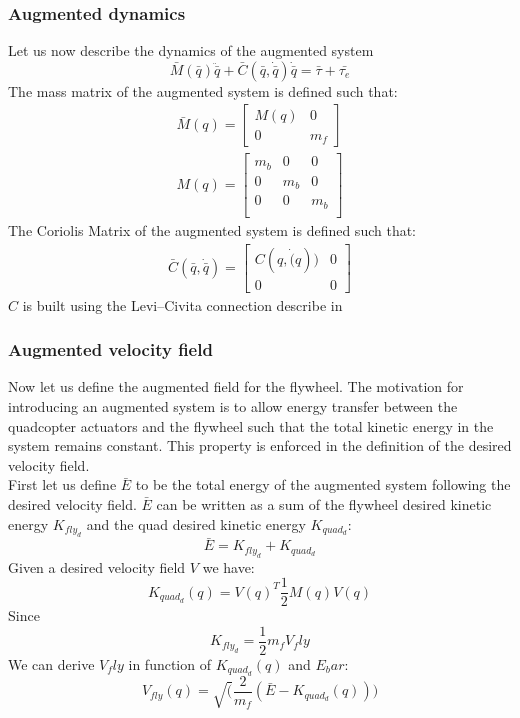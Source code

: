 \subsubsection{Augmented dynamics}
Let us now describe the dynamics of the augmented system
\begin{equation} 
    \bar{M}(\bar{q})\ddot{\bar{q}} + \bar{C}(\bar{q}, \dot{\bar{q}})\dot{\bar{q}} = \bar{\tau} + \bar{\tau_{e}}
\end{equation}
The mass matrix of the augmented system is defined such that:
\begin{align}
\bar{M}(q) = \begin{bmatrix} 
   M(q) & 0 \\
    0 & m_f
\end{bmatrix}\\
M(q) =  \begin{bmatrix} 
    m_b & 0 & 0 \\
    0 & m_b & 0 \\
    0 & 0 & m_b \\
 \end{bmatrix}
\end{align}
The Coriolis Matrix of the augmented system is defined such that: 
\begin{align}
\bar{C}(\bar{q}, \dot{\bar{q}}) = \begin{bmatrix} 
    C(q, \dot(q)) & 0 \\
    0 & 0 
\end{bmatrix}
\end{align}
$C$ is built using the Levi–Civita connection describe in \cite{li2001passive}
\subsubsection{Augmented velocity field}
Now let us define the augmented field for the flywheel. The motivation for introducing an augmented system is
to allow energy transfer between the quadcopter actuators and the flywheel such that the total kinetic energy in the system remains constant.
This property is enforced in the definition of the desired velocity field. \\
First let us define $\bar{E}$ to be the total energy of the augmented system following the desired velocity field.
$\bar{E}$ can be written as a sum of the flywheel desired kinetic energy $K_{fly_{d}}$ and the quad desired kinetic energy $K_{quad_{d}}$: 
\begin{equation}
    \bar{E} = K_{fly_{d}} + K_{quad_{d}}
\end{equation}
Given a desired velocity field $V$ we have: 
\begin{equation}
    K_{quad_{d}}(q) = V(q)^T\frac{1}{2}M(q)V(q)
\end{equation}
Since 
\begin{equation}
    K_{fly_{d}} = \frac{1}{2} m_f V_fly
\end{equation}
We can derive $V_fly$ in function of  $K_{quad_{d}}(q)$ and $E_bar$:
\begin{equation}
    V_{fly}(q) = \sqrt(\frac{2}{m_f}(\bar{E}- K_{quad_{d}}(q)))
\end{equation}
